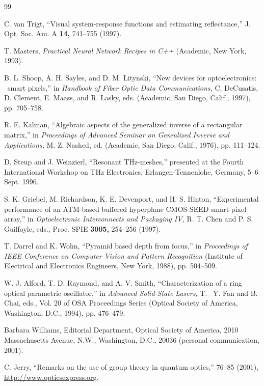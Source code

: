 \documentclass[letterpaper,11pt]{article}   %
\begin{document}


\begin{thebibliography}{99}

C. van Trigt, ``Visual system-response functions and estimating reflectance,'' %
J. Opt. Soc. Am. A {\bf 14,} 741--755 (1997).

T. Masters, {\it Practical Neural Network Recipes in C++} (Academic,
New York, 1993).

B. L. Shoop, A. H. Sayles, and D. M. Litynski, ``New devices for
optoelectronics:  \ smart pixels,'' in {\it Handbook of Fiber
Optic Data Communications,} C. DeCusatis, D. Clement, E. Maass,
and R. Lasky, eds. (Academic, San Diego, Calif., 1997), pp.
705--758.

R. E. Kalman, ``Algebraic aspects of the generalized inverse of a
rectangular matrix,'' in {\it Proceedings of Advanced Seminar on
Genralized Inverse and Applications,} M. Z. Nashed, ed. (Academic,
San Diego, Calif., 1976), pp. 111--124.

D. Steup and J. Weinzierl, ``Resonant THz-meshes,'' presented at the
Fourth International Workshop on THz Electronics,
Erlangen-Tennenlohe, Germany, 5--6 Sept. 1996.

 S. K. Griebel, M. Richardson, K. E. Devenport, and H. S. Hinton,
``Experimental performance of an ATM-based buffered hyperplane
CMOS-SEED smart pixel array,'' in {\it Optoelectronic
Interconnects and Packaging IV,} R. T. Chen and P. S. Guilfoyle,
eds., Proc. SPIE {\bf 3005,} 254--256 (1997).

T. Darrel and K. Wohn, ``Pyramid based depth from focus,'' in
{\it Proceedings of IEEE Conference on Computer Vision and Pattern
Recognition} (Institute of Electrical and Electronics Engineers,
New York, 1988), pp. 504--509.

 W. J. Alford, T. D. Raymond, and A. V. Smith, ``Characterization of a ring optical
parametric oscillator,'' in {\it Advanced Solid-State Lasers,} T.~
Y. Fan and B. Chai, eds., Vol. 20 of OSA Proceedings Series
(Optical Society of America, Washington, D.C., 1994), pp.
476--479.

Barbara Williams, Editorial Department, Optical Society of
America, 2010 Massa\-chusetts Avenue, N.W., Washington, D.C.,
20036 (personal communication, 2001).

C. Jerry, ``Remarks on the use of group
theory in quantum optics,''  76--85 (2001),
\href{http://www.opticsexpress.org}{http://www.opticsexpress.org}.

\end{thebibliography}
\end{document}
